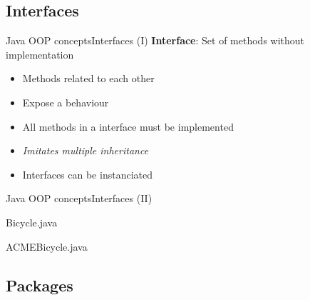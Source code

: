 \documentclass[10pt,compress]{beamer} %
\begin{document}
\subsection{Interfaces}

\begin{frame}{Java OOP concepts}{Interfaces (I)}
	\textbf{Interface}: Set of methods without implementation
		\begin{itemize}
		\item Methods related to each other
		\item Expose a behaviour
		\item All methods in a interface must be implemented
		\item \textit{Imitates multiple inheritance}
		\item Interfaces can be instanciated
		\end{itemize}
\end{frame}

\begin{frame}{Java OOP concepts}{Interfaces (II)}
			\begin{block}{Bicycle.java}
			\vspace{-0.2cm}
				
			\end{block}
			\begin{block}{ACMEBicycle.java}
			\vspace{-0.2cm}
				
			\end{block}
\end{frame}

\subsection{Packages}
\end{document}
